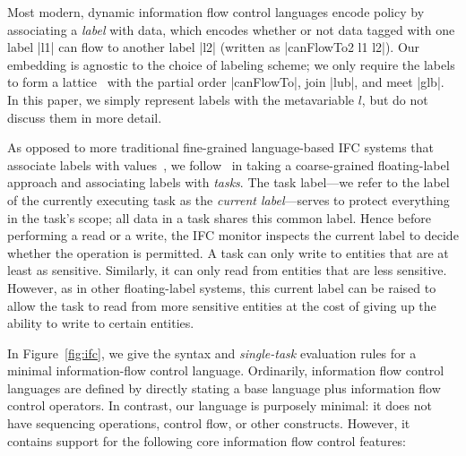 Most modern, dynamic information flow control languages encode
policy by associating a \emph{label}
with data, which encodes whether or not data tagged with one
label |l1| can flow to another label |l2| (written as |canFlowTo2 l1 l2|).
Our embedding is agnostic to the choice of labeling scheme; we only
require the labels to form a lattice~\cite{Denning:1976:LMS:360051.360056}
with the partial order |canFlowTo|, join |lub|, and meet |glb|.
In this paper, we simply represent labels with the metavariable
$l$, but do not discuss them in more detail.

As opposed to more traditional fine-grained language-based IFC systems that
associate labels with values~\cite{sabelfeld2003language,
Austin:Flanagan:PLAS09}, we follow~\cite{Zeldovich:2006, lio} in taking a
coarse-grained floating-label approach and associating labels with
\emph{tasks}.
%
The task label---we refer to the label of the currently executing task as the
\emph{current label}---serves to protect everything in the task's scope;
all data in a task shares this common label.
%
Hence before performing a read or a write, the IFC monitor inspects the
current label to decide whether the operation is permitted.
%
A task can only write to entities that are at least as sensitive.
%
Similarly, it can only read from entities that are less sensitive.
%
However, as in other floating-label systems, this current label can be raised
to allow the task to read from more sensitive entities at the cost of giving up
the ability to write to certain entities.

In Figure~\ref{fig:ifc}, we give the syntax and \emph{single-task}
evaluation rules for a minimal information-flow control language.  
Ordinarily, information flow control languages are defined by directly
stating a base language plus information flow control operators.  In
contrast, our language is purposely minimal: it does not have sequencing
operations, control flow, or other constructs.  However, it contains
support for the following core information flow control features:

